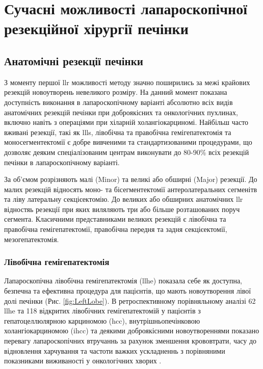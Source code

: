 \section[Сучасні можливості]{Сучасні можливості лапароскопічної резекційної хірургії печінки}

\subsection{Анатомічні резекції печінки}
	
З моменту першої \acrshort{llr} можливості методу значно поширились за межі крайових резекцій новоутворень невеликого розміру. На данний момент показана доступність виконання в лапароскопічному варіанті абсолютно всіх видів анатомічних резекцій печінки при доброякісних та онкологічних пухлинах, включно навіть з операціями при хіларній холангіокарциномі. Найбільш часто вживані резекції, такі як \acrshort{llls}, лівобічна та правобічна гемігепатектомія та моносегментектомії є добре вивченими та стандартизованими процедурами, що дозволяє деяким спеціалізованим центрам \cite{Garbarino2019} виконувати до 80-90\% всіх резекцій печінки в лапароскопічному варіанті.

За об'ємом розрізняють малі (Minor) та великі або обширні (Major) резекції. До малих резекцій відносять моно- та бісегментектомії антеролатеральних сегменітв та ліву латеральну секцієектомію. До великих або обширних анатомічних \acrshort{llr} відностяь резекції при яких виляляють три або більше розташованих поруч сегмента. Класичними представниками великих резекцій є лівобічна та правобічна гемігепатектомії, правобічна передня та задня секцієектомії, мезогепатектомія.

\subsubsection{Лівобічна гемігепатектомія}

Лапароскопічна лівобічна гемігепатектомія (\acrshort{llhe}) показала себе як доступна, безпечна та ефективна процедура для пацієнтів, що мають новоутворення лівої долі печінки (Рис. \ref{fig:LeftLobe}). В ретроспективному порівняльному аналізі 62 \acrshort{llhe} та 118 відкритих лівобічних гемігепатектомій у пацієнтів з гепатоцеллюлярною карциномою (\acrshort{hcc}), внутрішньопечінковою холангіокарциномою (\acrshort{ihcc}) та деякими доброякісними новоутвореннями показано перевагу лапароскопічних втручаннь за рахунок зменшення крововтрати, часу до відновлення харчування та частоти важких ускладненнь з порівняними показниками виживаності у онкологічних хворих \cite{Cho2018b}.   

